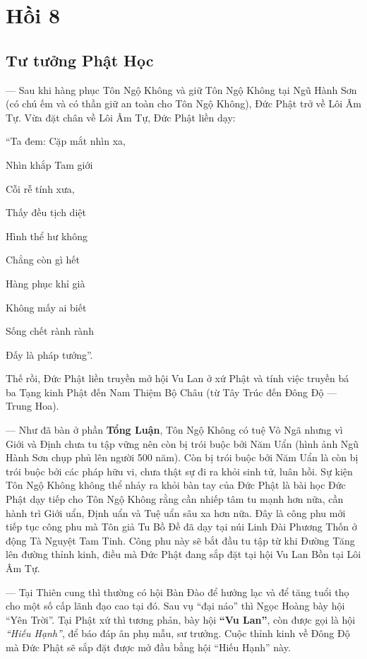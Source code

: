 \chapter{Hồi 8} %
\label{cha:hoi_8}

\section{Tư tưởng Phật Học} %
\label{sec:8_phat_hoc}

--- Sau khi hàng phục Tôn Ngộ Không và giữ Tôn Ngộ Không tại Ngũ Hành Sơn (có chú ếm và có thần giữ an toàn cho Tôn Ngộ Không), Đức Phật trở về Lôi Âm Tự. Vừa đặt chân về Lôi Âm Tự, Đức Phật liền dạy:

\begin{itshape}
``Ta đem: Cặp mắt nhìn xa,

Nhìn khắp Tam giới

Cỗi rễ tính xưa,

Thấy đều tịch diệt

Hình thể hư không

Chẳng còn gì hết

Hàng phục khỉ già

Không mấy ai biết

Sống chết rành rành

Đấy là pháp tướng''.
\end{itshape}

Thế rồi, Đức Phật liền truyền mở hội Vu Lan ở xứ Phật và tính việc truyền bá ba Tạng kinh Phật đến Nam Thiệm Bộ Châu (từ Tây Trúc đến Đông Độ --- Trung Hoa).

--- Như đã bàn ở phần {\bf Tổng Luận}, Tôn Ngộ Không có tuệ Vô Ngã nhưng vì Giới và Định chưa tu tập vững nên còn bị trói buộc bởi Năm Uẩn (hình ảnh Ngũ Hành Sơn chụp phủ lên người 500 năm). Còn bị trói buộc bởi Năm Uẩn là còn bị trói buộc bởi các pháp hữu vi, chưa thật sự đi ra khỏi sinh tử, luân hồi. Sự kiện Tôn Ngộ Không không thể nhảy ra khỏi bàn tay của Đức Phật là bài học Đức Phật dạy tiếp cho Tôn Ngộ Không rằng cần nhiếp tâm tu mạnh hơn nữa, cần hành trì Giới uẩn, Định uẩn và Tuệ uẩn sâu xa hơn nữa. Đây là công phu mới tiếp tục công phu mà Tôn giả Tu Bồ Đề đã dạy tại núi Linh Đài Phương Thốn ở động Tà Nguyệt Tam Tinh. Công phu này sẽ bắt đầu tu tập từ khi Đường Tăng lên đường thỉnh kinh, điều mà Đức Phật đang sắp đặt tại hội Vu Lan Bồn tại Lôi Âm Tự.

--- Tại Thiên cung thì thường có hội Bàn Đào để hưởng lạc và để tăng tuổi thọ cho một số cấp lãnh đạo cao tại đó. Sau vụ ``đại náo'' thì Ngọc Hoàng bày hội ``Yên Trời''. Tại Phật xứ thì tương phản, bày hội \textbf{``Vu Lan''}, còn được gọi là hội \emph{``Hiếu Hạnh''}, để báo đáp ân phụ mẫu, sư trưởng. Cuộc thỉnh kinh về Đông Độ mà Đức Phật sẽ sắp đặt được mở đầu bằng hội ``Hiếu Hạnh'' này.

